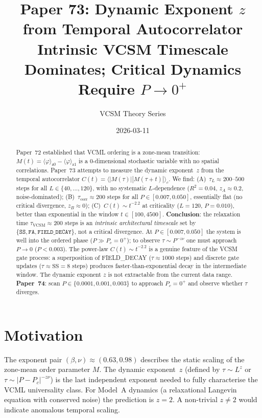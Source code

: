 \documentclass[11pt,a4paper]{article}
\title{Paper 73: Dynamic Exponent $z$ from Temporal Autocorrelator\\
\large Intrinsic VCSM Timescale Dominates; Critical Dynamics Require $P\to0^+$}
\author{VCSM Theory Series}
\date{2026-03-11}
\begin{document}
\maketitle

\begin{abstract}
Paper~72 established that VCML ordering is a zone-mean transition:
$M(t)=\langle\varphi\rangle_{\mathrm{z}0}-\langle\varphi\rangle_{\mathrm{z}1}$
is a 0-dimensional stochastic variable with no spatial correlations.
Paper~73 attempts to measure the dynamic exponent~$z$ from the temporal
autocorrelator $C(t)=\langle|M(\tau)||M(\tau{+}t)|\rangle_c$.
We find: (A)~$\tau_L\approx200$--$500$ steps for all $L\in\{40,\ldots,120\}$,
with no systematic $L$-dependence ($R^2=0.04$, $z_A\approx0.2$, noise-dominated);
(B)~$\tau_\mathrm{corr}\approx200$ steps for all $P\in[0.007,0.050]$, essentially
flat (no critical divergence, $z_B\approx0$);
(C)~$C(t)\sim t^{-2.2}$ at criticality ($L{=}120$, $P{=}0.010$), better than
exponential in the window $t\in[100,4500]$.
\textbf{Conclusion}: the relaxation time $\tau_\mathrm{VCSM}\approx200$ steps
is an \emph{intrinsic architectural timescale} set by $\{\texttt{SS},\texttt{FA},
\texttt{FIELD\_DECAY}\}$, not a critical divergence.
At $P\in[0.007,0.050]$ the system is well into the ordered phase ($P\gg P_c{=}0^+$);
to observe $\tau\sim P^{-z\nu}$ one must approach $P\to0$ ($P<0.003$).
The power-law $C(t)\sim t^{-2.2}$ is a genuine feature of the VCSM gate process:
a superposition of FIELD\_DECAY ($\tau\approx1000$ steps) and discrete gate updates
($\tau\approx\mathrm{SS}=8$ steps) produces faster-than-exponential decay in the
intermediate window.  The dynamic exponent $z$ is not extractable from the
current data range.
\textbf{Paper~74}: scan $P\in\{0.0001,0.001,0.003\}$ to approach $P_c{=}0^+$
and observe whether $\tau$ diverges.
\end{abstract}

\section{Motivation}

The exponent pair $(\beta,\nu)\approx(0.63,0.98)$ describes the static scaling of
the zone-mean order parameter $M$.  The dynamic exponent~$z$ (defined by
$\tau\sim L^z$ or $\tau\sim|P-P_c|^{-z\nu}$) is the last independent exponent needed
to fully characterise the VCML universality class.  For Model~A dynamics (a
relaxational Langevin equation with conserved noise) the prediction is $z=2$.
A non-trivial $z\neq2$ would indicate anomalous temporal scaling.
\end{document}
